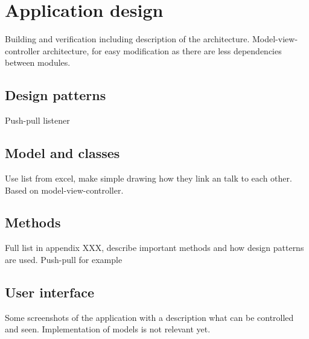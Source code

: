 \chapter{Application design}
Building and verification including description of the architecture. Model-view-controller architecture, for easy modification as there are less dependencies between modules.

\section{Design patterns}
Push-pull listener

\section{Model and classes}
Use list from excel, make simple drawing how they link an talk to each other. Based on model-view-controller.

\section{Methods}
Full list in appendix XXX, describe important methods and how design patterns are used. Push-pull for example

\section{User interface}
Some screenshots of the application with a description what can be controlled and seen. Implementation of models is not relevant yet.
